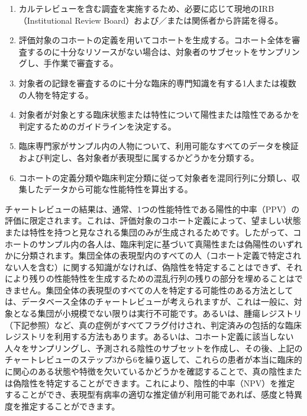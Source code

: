 \documentclass[
  11pt]{book}
\theoremstyle{definition}
\theoremstyle{definition}
\theoremstyle{definition}
\theoremstyle{definition}
\theoremstyle{remark}
\begin{document}
\begin{enumerate}
\def\labelenumi{\arabic{enumi}.}
\item
  カルテレビューを含む調査を実施するため、必要に応じて現地のIRB（Institutional Review Board）および／または関係者から許諾を得る。
\item
  評価対象のコホートの定義を用いてコホートを生成する。コホート全体を審査するのに十分なリソースがない場合は、対象者のサブセットをサンプリングし、手作業で審査する。
\item
  対象者の記録を審査するのに十分な臨床的専門知識を有する1人または複数の人物を特定する。
\item
  対象者が対象とする臨床状態または特性について陽性または陰性であるかを判定するためのガイドラインを決定する。
\item
  臨床専門家がサンプル内の人物について、利用可能なすべてのデータを検証および判定し、各対象者が表現型に属するかどうかを分類する。
\item
  コホートの定義分類や臨床判定分類に従って対象者を混同行列に分類し、収集したデータから可能な性能特性を算出する。
\end{enumerate}

チャートレビューの結果は、通常、1つの性能特性である陽性的中率（PPV）の評価に限定されます。これは、評価対象のコホート定義によって、望ましい状態または特性を持つと見なされる集団のみが生成されるためです。したがって、コホートのサンプル内の各人は、臨床判定に基づいて真陽性または偽陽性のいずれかに分類されます。集団全体の表現型内のすべての人（コホート定義で特定されない人を含む）に関する知識がなければ、偽陰性を特定することはできず、それにより残りの性能特性を生成するための混乱行列の残りの部分を埋めることはできません。集団全体の表現型のすべての人を特定する可能性のある方法としては、データベース全体のチャートレビューが考えられますが、これは一般に、対象となる集団が小規模でない限りは実行不可能です。あるいは、腫瘍レジストリ（下記参照）など、真の症例がすべてフラグ付けされ、判定済みの包括的な臨床レジストリを利用する方法もあります。あるいは、コホート定義に該当しない人々をサンプリングし、予測される陰性のサブセットを作成し、その後、上記の チャートレビューのステップ3から6を繰り返して、これらの患者が本当に臨床的に関心のある状態や特徴を欠いているかどうかを確認することで、真の陰性または偽陰性を特定することができます。これにより、陰性的中率（NPV）を推定することができ、表現型有病率の適切な推定値が利用可能であれば、感度と特異度を推定することができます。
\end{document}
